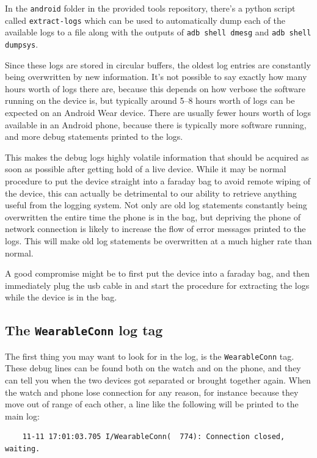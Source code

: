 \documentclass[a4paper,11pt,dvips]{article}
\begin{document}
\noindent
In the \texttt{android} folder in the provided tools repository, there's a python script called \texttt{extract-logs} which can be used to automatically dump each of the available logs to a file along with the outputs of \texttt{adb shell dmesg} and \texttt{adb shell dumpsys}.

Since these logs are stored in circular buffers, the oldest log entries are constantly being overwritten by new information. It's not possible to say exactly how many hours worth of logs there are, because this depends on how verbose the software running on the device is, but typically around 5--8 hours worth of logs can be expected on an Android Wear device. There are usually fewer hours worth of logs available in an Android phone, because there is typically more software running, and more debug statements printed to the logs.

This makes the debug logs highly volatile information that should be acquired as soon as possible after getting hold of a live device. While it may be normal procedure to put the device straight into a faraday bag to avoid remote wiping of the device, this can actually be detrimental to our ability to retrieve anything useful from the logging system. Not only are old log statements constantly being overwritten the entire time the phone is in the bag, but depriving the phone of network connection is likely to increase the flow of error messages printed to the logs. This will make old log statements be overwritten at a much higher rate than normal.

A good compromise might be to first put the device into a faraday bag, and then immediately plug the usb cable in and start the procedure for extracting the logs while the device is in the bag.


\subsection{The \texttt{WearableConn} log tag}

The first thing you may want to look for in the log, is the \texttt{WearableConn} tag. These debug lines can be found both on the watch and on the phone, and they can tell you when the two devices got separated or brought together again. When the watch and phone lose connection for any reason, for instance because they move out of range of each other, a line like the following will be printed to the main log:

\scriptsize
\begin{verbatim}
    11-11 17:01:03.705 I/WearableConn(  774): Connection closed, waiting.
\end{verbatim}
\normalsize
\end{document}
